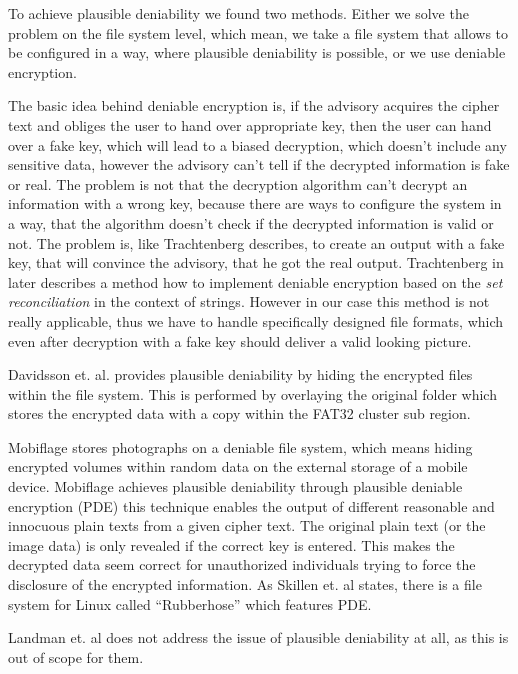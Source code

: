 \documentclass[12pt,a4paper,titlepage,oneside]{scrartcl}
\begin{document}
To achieve plausible deniability we found two methods.
Either we solve the problem on the file system level, which mean, we take a file system that allows to be configured in a way, where plausible deniability is possible, or we use deniable encryption.

The basic idea behind deniable encryption is, if the advisory acquires the cipher text and obliges the user to hand over appropriate key, then the user can hand over a fake key, which will lead to a biased decryption, which doesn't include any sensitive data, however the advisory can't tell if the decrypted information is fake or real. \cite{canetti1997deniable}
The problem is not that the decryption algorithm can't decrypt an information with a wrong key, because there are ways to configure the system in a way, that the algorithm doesn't check if the decrypted information is valid or not.
The problem is, like Trachtenberg describes, to create an output with a fake key, that will convince the advisory, that he got the real output. \cite{trachtenbergsay}
Trachtenberg in \cite{trachtenbergsay} later describes a method how to implement deniable encryption based on the \textit{set reconciliation} in the context of strings.
However in our case this method is not really applicable, thus we have to handle specifically designed file formats, which even after decryption with a fake key should deliver a valid looking picture.

Davidsson et. al. provides plausible deniability by hiding the encrypted files within the file system.
This is performed by overlaying the original folder which stores the encrypted data with a copy within the FAT32 cluster sub region. \cite{Davidsson2016}

Mobiflage stores photographs on a deniable file system, which means hiding encrypted volumes within random data on the external storage of a mobile device.
Mobiflage achieves plausible deniability through plausible deniable encryption (PDE) this technique enables the output of different reasonable and innocuous plain texts from a given cipher text.
The original plain text (or the image data) is only revealed if the correct key is entered.
This makes the decrypted data seem correct for unauthorized individuals trying to force the disclosure of the encrypted information.
As Skillen et. al states, there is a file system for Linux called ``Rubberhose'' which features PDE.

Landman et. al \cite{pmid25565678} does not address the issue of plausible deniability at all, as this is out of scope for them.
\end{document}
